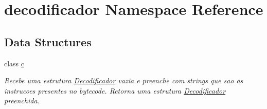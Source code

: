 \hypertarget{namespacedecodificador}{}\section{decodificador Namespace Reference}
\label{namespacedecodificador}
\subsection*{Data Structures}
\begin{DoxyCompactItemize}
\item 
class \hyperlink{classdecodificador_1_1c}{c}
\begin{DoxyCompactList}\small\item\em Recebe uma estrutura \hyperlink{structDecodificador}{Decodificador} vazia e preenche com strings que sao as instrucoes presentes no bytecode. Retorna uma estrutura \hyperlink{structDecodificador}{Decodificador} preenchida. \end{DoxyCompactList}\end{DoxyCompactItemize}
